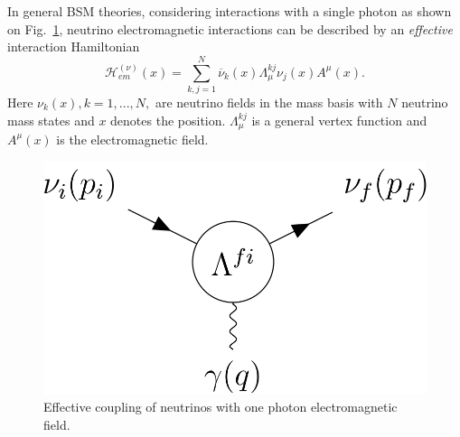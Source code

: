 In general \gls{BSM} theories, considering interactions with a single photon as shown on Fig.~\ref{fig:FeynmanNuElmagDiagram}, neutrino electromagnetic interactions can be described by an \textit{effective} interaction Hamiltonian \cite{nuElmagInt2015.pdf}
\begin{equation}
\mathcal{H}^{\left(\nu\right)}_{em}\left(x\right)=\sum^N_{k,j=1}\overline{\nu}_k\left(x\right)\Lambda^{kj}_{\mu}\nu_j\left(x\right)A^{\mu}\left(x\right).
\end{equation}
Here $\nu_k\left(x\right), k = 1,...,N,$ are neutrino fields in the mass basis with $N$ neutrino mass states and $x$ denotes the position. $\Lambda^{kj}_{\mu}$ is a general vertex function and $A^{\mu}\left(x\right)$ is the electromagnetic field.

\begin{figure}[hbtp]
\centering
\includegraphics[width=0.4\linewidth]{Plots/NuMM/FeynmanDiagramNuElmagInt.png}
\caption{Effective coupling of neutrinos with one photon electromagnetic field.}
\label{fig:FeynmanNuElmagDiagram}
\end{figure}

